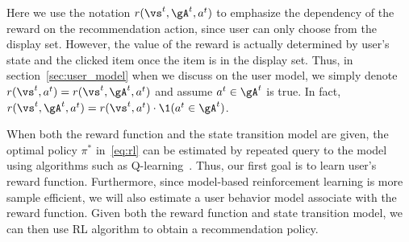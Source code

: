 \documentclass{article} %
\newcommand{\xc}[1]{{\color{blue}{\bf\sf [#1]}}}
\newcommand{\shuang}[1]{{\color{purple}{\bf\sf[ #1]}}}
\newcommand{\Li}[1]{{\color{cyan}{\bf\sf [Li: #1]}}}
\begin{document}
%
Here we use the notation $r(\vs^t, \gA^t, a^t)$ to emphasize the dependency of the reward on the recommendation action, since user can only choose from the display set. However, the value of the reward is actually determined by user's state and the clicked item once the item is in the display set. Thus, in section~\ref{sec:user_model} when we discuss on the user model, we simply denote $r(\vs^t, a^t)=r(\vs^t, \gA^t, a^t)$ and assume $a^t\in \gA^t$ is true. In fact, $r(\vs^t, \gA^t, a^t) =r(\vs^t, a^t)\cdot \1(a^t\in \gA^t) $.

%
%

When both the reward function and the state transition model are given, the optimal policy $\pi^\ast$ in~\eqref{eq:rl} can be estimated by repeated query to the model using algorithms such as Q-learning~\citep{Watkins89}. Thus, our first goal is to learn user's reward function. Furthermore, since model-based reinforcement learning is more sample efficient, we will also estimate a user behavior model associate with the reward function. Given both the reward function and state transition model, we can then use \Li{\st{an}a} RL algorithm to obtain a recommendation policy.



\end{document}

